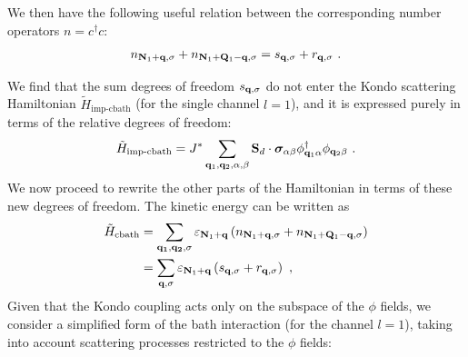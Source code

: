 We then have the following useful relation between the corresponding number operators \(n = c^\dagger c\):
\begin{equation}\begin{aligned}\label{numberOperatorRelation}
	n_{{\bf N}_1 + {\bf q},\sigma} + n_{{\bf N}_1 + {\bf Q}_1 - {\bf q}, \sigma} = s_{{\bf q}, \sigma} + r_{{\bf q},\sigma}~.
\end{aligned}\end{equation}

We find that the sum degrees of freedom \(s_{{\bf q},\sigma}\) do not enter the Kondo scattering Hamiltonian \(\tilde H_\text{imp-cbath}\) (for the single channel \(l=1\)), and it is expressed purely in terms of the relative degrees of freedom:
\begin{equation}\begin{aligned}
	\tilde H_\text{imp-cbath} = J^*\sum_{{\bf q}_1, {\bf q}_2,\alpha,\beta}{\bf S}_d\cdot{\boldsymbol\sigma}_{\alpha\beta} {\phi}^\dagger_{{\bf q}_1\alpha} \phi_{{\bf q}_2\beta}~.
\end{aligned}\end{equation}
We now proceed to rewrite the other parts of the Hamiltonian in terms of these new degrees of freedom. The kinetic energy can be written as
\begin{equation}\begin{aligned}\label{kineticEnergy}
	\tilde H_\text{cbath} &= \sum_{{\bf q_1,\bf q_2},\sigma}\varepsilon_{{\bf N}_1 + {\bf q}}\left(n_{{\bf N}_1 + {\bf q},\sigma} + n_{{\bf N}_1 + {\bf Q}_1 - {\bf q},\sigma}\right)\\
						  &= \sum_{{\bf q},\sigma}\varepsilon_{{\bf N}_1 + {\bf q}}\left(s_{{\bf q}, \sigma} + r_{{\bf q},\sigma}\right)~,
\end{aligned}\end{equation}
Given that the Kondo coupling acts only on the subspace of the \(\phi\) fields, we consider a simplified form of the bath interaction (for the channel \(l=1\)), taking into account scattering processes restricted to the \(\phi\) fields:
